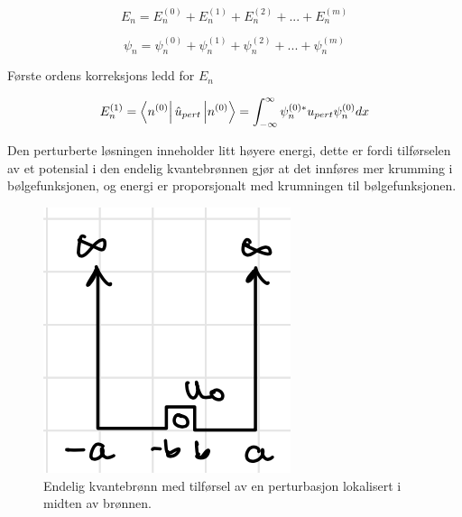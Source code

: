 \begin{equation}
    \label{eq:pertEnergi}
    E_n = E_n^{(0)} + E_n^{(1)} + E_n^{(2)} + ... + E_n^{(m)}
\end{equation}

\begin{equation}
    \label{eq:pertWave}
    \psi_n = \psi_n^{(0)} + \psi_n^{(1)}  + \psi_n^{(2)}+ ... + \psi_n^{(m)} 
\end{equation}

Første ordens korreksjons ledd for $E_n$

\begin{equation}
    E_n^{(1)} = \bra{n^{(0)}} \hat{u}_{pert} \ket{n^{(0)}}
    =
    \int_{-\infty}^{\infty} \psi_n^{(0)*}u_{pert}\psi_n^{(0)}dx
\end{equation}

Den perturberte løsningen inneholder litt høyere energi, dette er fordi tilførselen av et potensial i den endelig kvantebrønnen gjør at det innføres mer krumming i bølgefunksjonen, og energi er proporsjonalt med krumningen til bølgefunksjonen. 

\begin{figure}[!htb]
    \centering
    \includegraphics{Bilder/SamtaleTema2/Pertubasjonsteori/pert.png}
    \caption{Endelig kvantebrønn med tilførsel av en perturbasjon lokalisert i midten av brønnen.}
    \label{fig:figPert}
\end{figure}

\newpage